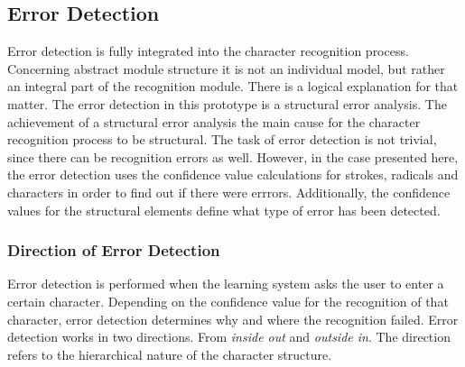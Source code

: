 \subsection{Error Detection}
\label{sec:hwre:errordetection}





Error detection is fully integrated into the character recognition process.
Concerning abstract module structure it is not an individual model, but rather
an integral part of the recognition module.
There is a logical explanation for that matter. The error detection in this 
prototype is a structural error analysis. The achievement of a structural error 
analysis the main cause for the character recognition process to be structural.
The task of error detection is not trivial, since there can be recognition errors
as well. However, in the case presented here, the error detection uses the
confidence value calculations for strokes, radicals and characters in order
to find out if there were errrors. Additionally, the confidence values
for the structural elements define what type of error has been detected.

\subsubsection{Direction of Error Detection}
\label{sec:hwre:directionoferrordetection}

Error detection is performed when the learning system asks the user to enter a
certain character. Depending on the confidence value for the recognition of that
character, error detection determines why and where the recognition failed. 
Error detection works in two directions. From \emph{inside out} 
and \emph{outside in}. The direction refers to the hierarchical nature of the 
character structure.

